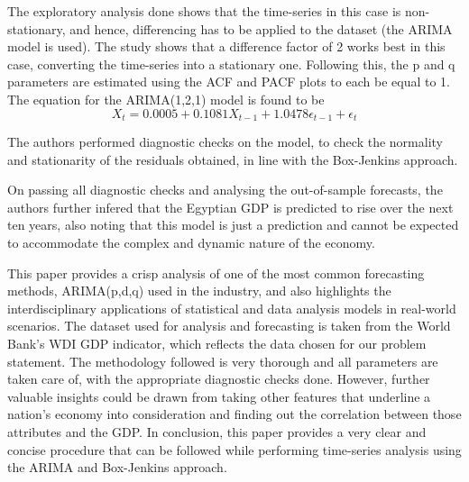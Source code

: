 \documentclass[conference]{IEEEtran}
\begin{document}
The exploratory analysis done shows that the time-series in this case is non-stationary, and hence, differencing has to be applied to the dataset (the ARIMA model is used). The study shows that a difference factor of 2 works best in this case, converting the time-series into a stationary one. Following this, the p and q parameters are estimated using the ACF and PACF plots to each be equal to 1.
The equation for the ARIMA(1,2,1) model is found to be
\[X_t = 0.0005 + 0.1081X_{t-1} + 1.0478\epsilon_{t-1} + \epsilon_t \]


The authors performed diagnostic checks on the model, to check the normality and stationarity of the residuals obtained, in line with the Box-Jenkins approach. 

On passing all diagnostic checks and analysing the out-of-sample forecasts, the authors further infered that the Egyptian GDP is predicted to rise over the next ten years, also noting that this model is just a prediction and cannot be expected to accommodate the complex and dynamic nature of the economy. 

This paper provides a crisp analysis of one of the most common forecasting methods, ARIMA(p,d,q) used in the industry, and also highlights the interdisciplinary applications of statistical and data analysis models in real-world scenarios. The dataset used for analysis and forecasting is taken from the World Bank’s WDI GDP indicator, which reflects the data chosen for our problem statement. The methodology followed is very thorough and all parameters are taken care of, with the appropriate diagnostic checks done. However, further valuable insights could be drawn from taking other features that underline a nation’s economy into consideration and finding out the correlation between those attributes and the GDP. In conclusion, this paper provides a very clear and concise procedure that can be followed while performing time-series analysis using the ARIMA and Box-Jenkins approach.

\begin{comment}
The IEEEtran class file is used to format your paper and style the text. All margins, 
column widths, line spaces, and text fonts are prescribed; please do not 
alter them. You may note peculiarities. For example, the head margin
measures proportionately more than is customary. This measurement 
and others are deliberate, using specifications that anticipate your paper 
as one part of the entire proceedings, and not as an independent document. 
Please do not revise any of the current designations.
\end{comment}
\end{document}
